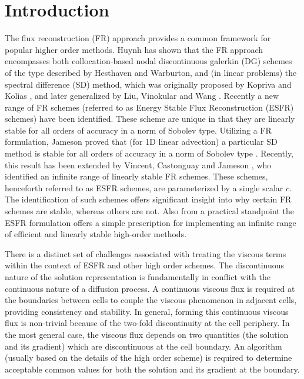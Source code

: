 \section{Introduction}

The flux reconstruction (FR) approach provides a common framework for popular higher order methods. Huynh \cite{Huynh07} has shown that the FR approach encompasses both collocation-based nodal discontinuous galerkin (DG) schemes of the type described by Hesthaven and Warburton\cite{Hesthaven08}, and (in linear problems) the spectral difference (SD) method, which was originally proposed by Kopriva and Kolias \cite{Kopriva96}, and later generalized by Liu, Vinokular and Wang \cite{Liu06}. Recently a new range of FR schemes (referred to as Energy Stable Flux Reconstruction (ESFR) schemes) have been identified. These scheme are unique in that they are linearly stable for all orders of accuracy in a norm of Sobolev type. Utilizing a FR formulation, Jameson proved that (for 1D linear advection) a particular SD method is stable for all orders of accuracy in a norm of Sobolev type \cite{Jameson10}. Recently, this result has been extended by Vincent, Castonguay and Jameson \cite{Vincent10}, who identified an infinite range of linearly stable FR schemes. These schemes, henceforth referred to as ESFR schemes, are parameterized by a single scalar $c$. The identification of such schemes offers significant insight into why certain FR schemes are stable, whereas others are not. Also from a practical standpoint the ESFR formulation offers a simple prescription for implementing an infinite range of efficient and linearly stable high-order methods. 

\vspace{0.1 in}

\noindent There is a distinct set of challenges associated with treating the viscous terms within the context of ESFR and other high order schemes. The discontinuous nature of the solution representation is fundamentally in conflict with the continuous nature of a diffusion process.  A continuous viscous flux is required at the boundaries between cells to couple the viscous phenomenon in adjacent cells, providing consistency and stability. In general, forming this continuous viscous flux is non-trivial because of the two-fold discontinuity at the cell periphery. In the most general case, the viscous flux depends on two quantities (the solution and its gradient) which are discontinuous at the cell boundary. An algorithm (usually based on the details of the high order scheme) is required to determine acceptable common values for both the solution and its gradient at the boundary.  

